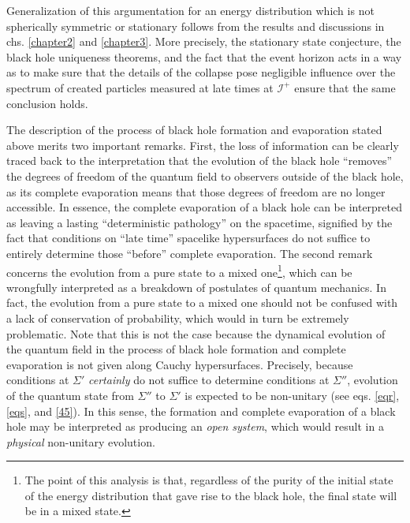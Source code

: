 \documentclass[
12pt,		%
openright,	%
twoside,  %
a4paper,			%
chapter=TITLE,		%
english,			%
french,				%
spanish,			%
brazil				%
]{USPSC-classe/USPSC}
\begin{document}
Generalization of this argumentation for an energy distribution which is not spherically symmetric or stationary follows from the results and discussions in chs. \ref{chapter2} and \ref{chapter3}. More precisely, the stationary state conjecture, the black hole uniqueness theorems, and the fact that the event horizon acts in a way as to make sure that the details of the collapse pose negligible influence over the spectrum of created particles measured at late times at $\mathscr{I}^+$ ensure that the same conclusion holds. 

The description of the process of black hole formation and evaporation stated above merits two important remarks. First, the loss of information can be clearly traced back to the interpretation that the evolution of the black hole ``removes'' the degrees of freedom of the quantum field to observers outside of the black hole, as its complete evaporation means that those degrees of freedom are no longer accessible. In essence, the complete evaporation of a black hole can be interpreted as leaving a lasting ``deterministic pathology'' on the spacetime, signified by the fact that conditions on ``late time'' spacelike hypersurfaces do not suffice to entirely determine those ``before'' complete evaporation. The second remark concerns the evolution from a pure state to a mixed one\footnote{The point of this analysis is that, regardless of the purity of the initial state of the energy distribution that gave rise to the black hole, the final state will be in a mixed state.}, which can be wrongfully interpreted as a breakdown of postulates of quantum mechanics. In fact, the evolution from a pure state to a mixed one should not be confused with a lack of conservation of probability, which would in turn be extremely problematic. Note that this is not the case because the dynamical evolution of the quantum field in the process of black hole formation and complete evaporation is not given along Cauchy hypersurfaces. Precisely, because conditions at $\Sigma'$ \textit{certainly} do not suffice to determine conditions at $\Sigma''$, evolution of the quantum state from $\Sigma''$ to $\Sigma'$ is expected to be non-unitary (see eqs. \ref{eqr}, \ref{eqs}, and \ref{45}). In this sense, the formation and complete evaporation of a black hole may be interpreted as producing an \textit{open system}, which would result in a \textit{physical} non-unitary evolution.
\end{document}
